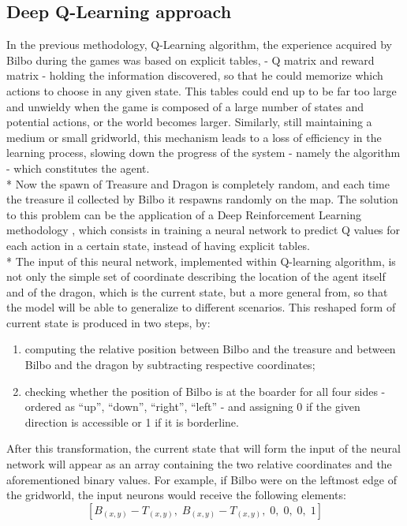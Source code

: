 \subsection{Deep Q-Learning approach}
In the previous methodology, Q-Learning algorithm, the experience acquired by Bilbo during the games was based on explicit tables, - Q matrix and reward matrix - holding the information discovered, so that he could memorize which actions to choose in any given state. This tables could end up to be far too large and unwieldy when the game is composed of a large number of states and potential actions, or the world becomes larger. Similarly, still maintaining a medium or small gridworld, this mechanism leads to a loss of efficiency in the learning process, slowing down the progress of the system - namely the algorithm - which constitutes the agent.\\*
Now the spawn of Treasure and Dragon is completely random, and each time the treasure il collected by Bilbo it respawns randomly on the map.
The solution to this problem can be the application of a Deep Reinforcement Learning methodology \cite{3,5,6}, which consists in training a neural network to predict Q values for each action in a certain state, instead of having explicit tables.\\*
The input of this neural network, implemented within Q-learning algorithm, is not only the simple set of coordinate describing the location of the agent itself and of the dragon, which is the current state, but a more general from, so that the model will be able to generalize to different scenarios. This reshaped form of current state is produced in two steps, by:
\begin{enumerate}[noitemsep, topsep=0ex]
  \item computing the relative position between Bilbo and the treasure and between Bilbo and the dragon by subtracting respective coordinates;
  \item checking whether the position of Bilbo is at the boarder  for all four sides - ordered as ``up'', ``down'', ``right'', ``left'' - and assigning 0 if the given direction is accessible or 1 if it is borderline.
\end{enumerate}
After this transformation, the current state that will form the input of the neural network will appear as an array containing the two relative coordinates and the aforementioned binary values. For example, if Bilbo were on the leftmost edge of the gridworld, the input neurons would receive the following elements:
$$
[B_{(x,y)}-T_{(x,y)},\;B_{(x,y)}-T_{(x,y)},\;0,\;0,\;0,\;1]
$$
